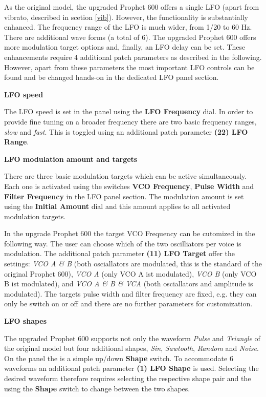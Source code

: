 As the original model, the upgraded Prophet 600 offers a single LFO (apart from vibrato, described in scetion \ref{vib}). However, the functionality is substantially enhanced. The frequency range of the LFO is much wider, from 1/20 to 60 Hz. There are additional wave forms (a total of 6). The upgraded Prophet 600 offers more modulation target options and, finally, an LFO delay can be set. These enhancements require 4 additional patch parameters as described in the following. However, apart from these parameters the most important LFO controls can be found and be changed hands-on in the dedicated LFO panel section. 

\textbf{LFO speed}

The LFO speed is set in the panel using the \textbf{LFO Frequency} dial. In order to provide fine tuning on a broader frequency there are two basic frequency ranges, \textit{slow} and \textit{fast}. This is toggled using an additional patch parameter \textbf{(22) LFO Range}. 

\textbf{LFO modulation amount and targets}

There are three basic modulation targets which can be active simultaneously. Each one is activated using the switches \textbf{VCO Frequency}, \textbf{Pulse Width} and \textbf{Filter Frequency} in the LFO panel section. The modulation amount is set using the \textbf{Initial Amount} dial and this amount applies to all activated modulation targets. 

In the upgrade Prophet 600 the target VCO Frequency can be cutomized in the following way. The user can choose which of the two oscilliators per voice is modulation. The additional patch parameter \textbf{(11) LFO Target} offer the settings: \textit{VCO A \& B} (both osciallators are modulated, this is the standard of the original Prophet 600), \textit{VCO A} (only VCO A ist modulated), \textit{VCO B} (only VCO B ist modulated),  and \textit{VCO A \& B \& VCA} (both osciallators and amplitude is modulated). The targets pulse width and filter frequency are fixed, e.g. they can only be switch on or off and there are no further parameters for customization.

\textbf{LFO shapes}

The upgraded Prophet 600 supports not only the waveform \textit{Pulse} and \textit{Triangle} of the original model but four additional shapes, \textit{Sin}, \textit{Sawtooth}, \textit{Random} and \textit{Noise}. On the panel the is a simple up/down \textbf{Shape} switch. To accommodate 6 waveforms an additional patch parameter \textbf{(1) LFO Shape} is used. Selecting the desired waveform therefore requires selecting the respective shape pair and the using the \textbf{Shape} switch to change between the two shapes. 

